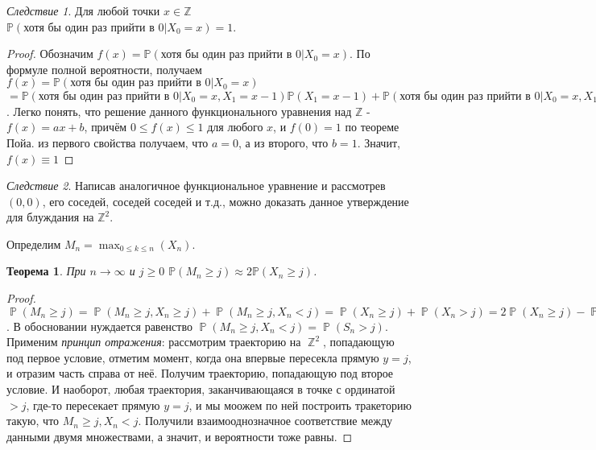 \documentclass[a4paper,100pt]{article}
\theoremstyle{indented}
\newtheorem{theorem}{Теорема}
\theoremstyle{definition}
\theoremstyle{remark}
\newtheorem{cons}{Следствие}
\DeclareMathOperator{\ZZ}{\mathbb{Z}}
\DeclareMathOperator{\PP}{\mathbb{P}}
\begin{document}
\begin{cons}
  Для любой точки $x \in \mathbb{Z}$ $\mathbb{P}(\text{хотя бы один раз прийти в 0} | X_0=x)=1$.
\end{cons}

\begin{proof}
  Обозначим $f(x)=\mathbb{P}(\text{хотя бы один раз прийти в 0} | X_0=x)$. По формуле полной вероятности, получаем $f(x)=\mathbb{P}(\text{хотя бы один раз прийти в 0} | X_0=x)$ $=\mathbb{P}(\text{хотя бы один раз прийти в 0} | X_0=x, X_1=x-1) \mathbb{P}(X_1=x-1)+\mathbb{P}(\text{хотя бы один раз прийти в 0} | X_0=x, X_1=x+1) \mathbb{P}(X_1=x+1)=\frac{1}{2}(f(x-1)+f(x+1))$. Легко понять, что решение данного функционального уравнения над $\mathbb{Z}$ - $f(x)=ax+b$, причём $0 \leq f(x) \leq 1$ для любого $x$, и $f(0)=1$ по теореме Пойа. из первого свойства получаем, что $a=0$, а из второго, что $b=1$. Значит, $f(x) \equiv 1$
\end{proof}

\begin{cons}
  Написав аналогичное функциональное уравнение и рассмотрев $(0, 0)$, его соседей, соседей соседей и т.д., можно доказать данное утверждение для блуждания на $\mathbb{Z}^2$.
\end{cons}

Определим $M_n=\max_{0 \leq k \leq n} (X_n)$. \\

\begin{theorem}
  При $n \rightarrow \infty$ и $j \geq 0$ $\mathbb{P}(M_n \geq j) \approx 2 \mathbb{P}(X_n \geq j)$.
\end{theorem}

\begin{proof}
  $\PP(M_n \geq j) = \PP(M_n \geq j, X_n \geq j)+\PP(M_n \geq j, X_n <j) = \PP(X_n \geq j)+\PP(X_n>j)=2\PP(X_n \geq j)-\PP(X_n=j) \approx 2\PP(X_n \geq j)$. В обосновании нуждается равенство $\PP(M_n \geq j, X_n <j)=\PP(S_n>j)$. Применим \textit{принцип отражения}: рассмотрим траекторию на $\ZZ^2$, попадающую под первое условие, отметим момент, когда она впервые пересекла прямую $y=j$, и отразим часть справа от неё. Получим траекторию, попадающую под второе условие. И наоборот, любая траектория, заканчивающаяся в точке с ординатой $> j$, где-то пересекает прямую $y=j$, и мы моожем по ней построить тракеторию такую, что $M_n \geq j, X_n <j$. Получили взаимооднозначное соответствие между данными двумя множествами, а значит, и вероятности тоже равны.
\end{proof}
\end{document}
